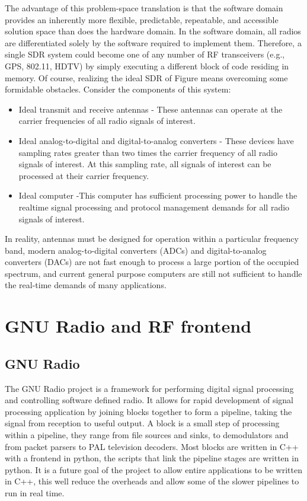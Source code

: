 \documentclass[a4paper,10pt]{article}
\begin{document}
The advantage of this problem-space translation is that the software
domain provides an inherently more flexible, predictable,
repeatable, and accessible solution space than does the hardware
domain. In the software domain, all radios are differentiated solely
by the software required to implement them. Therefore, a single SDR
system could become one of any number of RF transceivers (e.g., GPS,
802.11, HDTV) by simply executing a different block of code residing
in memory. Of course, realizing the ideal SDR of Figure means
overcoming some formidable obstacles. Consider the components of
this system: 
\begin{itemize}
\item Ideal transmit and receive antennas - These
antennas can operate at the carrier frequencies of all radio signals
of interest. 
\item Ideal analog-to-digital and digital-to-analog converters - These devices have sampling rates
greater than two times the carrier frequency of all radio signals of
interest. At this sampling rate, all signals of interest can be
processed at their carrier frequency.
\item Ideal computer -This computer has sufficient processing power to handle the realtime
signal processing and protocol management demands for all radio
signals of interest. 
\end{itemize}
In reality, antennas must be designed for
operation within a particular frequency band, modern
analog-to-digital converters (ADCs) and digital-to-analog converters
(DACs) are not fast enough to process a large portion of the
occupied spectrum, and current general purpose computers are still
not sufficient to handle the real-time demands of many applications.
\newpage
\section{GNU Radio and RF frontend}
\subsection{GNU Radio}
The GNU Radio project is a framework for performing digital signal
processing and controlling software defined radio. It allows for
rapid development of signal processing application by joining blocks
together to form a pipeline, taking the signal from reception to
useful output. A block is a small step of processing within a
pipeline, they range from file sources and sinks, to demodulators
and from packet parsers to PAL television decoders. Most blocks are
written in C++ with a frontend in python, the scripts that link the
pipeline stages are written in python. It is a future goal of the
project to allow entire applications to be written in C++, this well
reduce the overheads and allow some of the slower pipelines to run
in real time.
\end{document}
